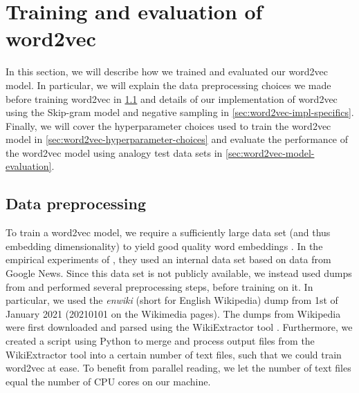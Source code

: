 \section{Training and evaluation of word2vec}
\label{sec:training-and-eval-our-word2vec-impl}
In this section, we will describe how we trained and evaluated our word2vec model. In particular, we will explain the data preprocessing choices we made before training word2vec in \cref{sec:word2vec-data-preprocessing} and details of our implementation of word2vec using the Skip-gram model and negative sampling in \cref{sec:word2vec-impl-specifics}. Finally, we will cover the hyperparameter choices used to train the word2vec model in \cref{sec:word2vec-hyperparameter-choices} and evaluate the performance of the word2vec model using analogy test data sets in \cref{sec:word2vec-model-evaluation}.

\subsection{Data preprocessing}
\label{sec:word2vec-data-preprocessing}
To train a word2vec model, we require a sufficiently large data set (and thus embedding dimensionality) to yield good quality word embeddings \cite{mikolov2013b}. In the empirical experiments of \cite{mikolov2013b}, they used an internal data set based on data from Google News. Since this data set is not publicly available, we instead used dumps from \cite{WikimediaDumps} and performed several preprocessing steps, before training on it. In particular, we used the \textit{enwiki} (short for English Wikipedia) dump from 1st of January 2021 (20210101 on the Wikimedia pages). The dumps from Wikipedia were first downloaded and parsed using the WikiExtractor tool \cite{Wikiextractor2015}. Furthermore, we created a script using Python to merge and process output files from the WikiExtractor tool into a certain number of text files, such that we could train word2vec at ease. To benefit from parallel reading, we let the number of text files equal the number of CPU cores on our machine.

